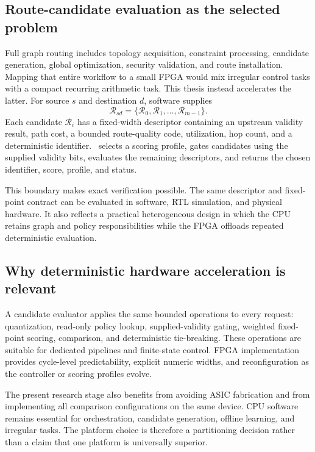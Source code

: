 \subsection{Route-candidate evaluation as the selected problem}

Full graph routing includes topology acquisition, constraint processing, candidate
generation, global optimization, security validation, and route installation.
Mapping that entire workflow to a small FPGA would mix irregular control tasks with
a compact recurring arithmetic task. This thesis instead accelerates the latter.
For source $s$ and destination $d$, software supplies
\begin{equation}
\mathcal{R}_{sd}
=
\{\mathcal{R}_0,\mathcal{R}_1,\ldots,\mathcal{R}_{m-1}\}.
\label{eq:intro-candidate-set}
\end{equation}
Each candidate $\mathcal{R}_i$ has a fixed-width descriptor containing an upstream
validity result, path cost, a bounded route-quality code, utilization, hop count,
and a deterministic identifier. \QFlow\ selects a scoring profile, gates candidates
using the supplied validity bits, evaluates the remaining descriptors, and returns
the chosen identifier, score, profile, and status.

This boundary makes exact verification possible. The same descriptor and fixed-point
contract can be evaluated in software, RTL simulation, and physical hardware. It
also reflects a practical heterogeneous design in which the CPU retains graph and
policy responsibilities while the FPGA offloads repeated deterministic evaluation.

\subsection{Why deterministic hardware acceleration is relevant}

A candidate evaluator applies the same bounded operations to every request:
quantization, read-only policy lookup, supplied-validity gating, weighted fixed-point
scoring, comparison, and deterministic tie-breaking. These operations are suitable
for dedicated pipelines and finite-state control. FPGA implementation provides
cycle-level predictability, explicit numeric widths, and reconfiguration as the
controller or scoring profiles evolve.

The present research stage also benefits from avoiding ASIC fabrication and from
implementing all comparison configurations on the same device. CPU software remains
essential for orchestration, candidate generation, offline learning, and irregular
tasks. The platform choice is therefore a partitioning decision rather than a claim
that one platform is universally superior.

